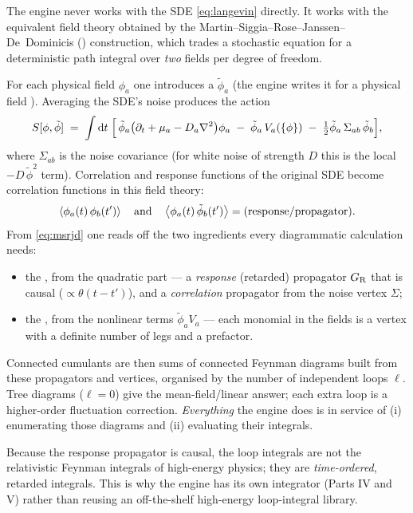 The engine never works with the SDE \eqref{eq:langevin} directly.  It works with
the equivalent field theory obtained by the
Martin--Siggia--Rose--Janssen--De~Dominicis (\msrjd) construction, which trades a
stochastic equation for a deterministic path integral over \emph{two} fields per
degree of freedom.

For each physical field $\phi_a$ one introduces a 
$\tilde\phi_a$ (the engine writes it  for a physical field ).
Averaging the SDE's noise produces the action
\begin{equation}
  S[\phi,\tilde\phi]
   \;=\; \int \mathrm{d} t \; \Big[\,
      \tilde\phi_a\big(\partial_t + \mu_a - D_a\nabla^2\big)\phi_a
      \;-\; \tilde\phi_a\,V_a(\{\phi\})
      \;-\; \tfrac12 \tilde\phi_a\,\Sigma_{ab}\,\tilde\phi_b
   \Big],
  \label{eq:msrjd}
\end{equation}
where $\Sigma_{ab}$ is the noise covariance (for white noise of strength $D$ this
is the local $-D\,\tilde\phi^2$ term).  Correlation and response functions of the
original SDE become correlation functions in this field theory:
\begin{equation}
  \left\langle \phi_a(t)\,\phi_b(t') \right\rangle \quad\text{and}\quad
  \left\langle \phi_a(t)\,\tilde\phi_b(t') \right\rangle = \text{(response/propagator)}.
\end{equation}
From \eqref{eq:msrjd} one reads off the two ingredients every diagrammatic
calculation needs:

\begin{itemize}
  \item the , from the quadratic part --- a
        \emph{response} (retarded) propagator $G_{\mathrm R}$ that is causal
        ($\propto \theta(t-t')$), and a \emph{correlation} propagator from the
        noise vertex $\Sigma$;
  \item the , from the nonlinear terms
        $\tilde\phi_a V_a$ --- each monomial in the fields is a vertex with a
        definite number of legs and a prefactor.
\end{itemize}

Connected cumulants are then sums of connected Feynman diagrams built from these
propagators and vertices, organised by the number of independent loops $\ell$.
Tree diagrams ($\ell=0$) give the mean-field/linear answer; each extra loop is a
higher-order fluctuation correction.  \emph{Everything} the engine does is in
service of (i) enumerating those diagrams and (ii) evaluating their integrals.

\begin{note}
Because the response propagator is causal, the loop integrals are not the
relativistic Feynman integrals of high-energy physics; they are
\emph{time-ordered}, retarded integrals.  This is why the engine has its own
integrator (Parts IV and V) rather than reusing an off-the-shelf high-energy
loop-integral library.
\end{note}

